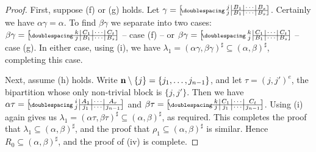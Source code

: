 \begin{lemma}
\begin{proof}
    First, suppose (f) or (g) holds.  Let
    $\gamma = \bipart{c|c|c|c}{2-4}
    {j & B_1 & \cdots & B_s}{j & B_1 & \cdots & B_s}$.  Certainly we have
    $\alpha\gamma = \alpha$.  To find $\beta\gamma$ we separate into two cases:
    $\beta\gamma = \bipart{c|c|c|c}{1-4}
    {k & C_1 & \cdots & C_t}{j & B_1 & \cdots & B_s}$ -- case (f) -- or
    $\beta\gamma = \bipart{c|c|c|c}{2-4}
    {k & C_1 & \cdots & C_t}{j & B_1 & \cdots & B_s}$ -- case (g).
    In either case, using (i), we have
    $\lambda_1 = (\alpha\gamma, \beta\gamma)^\sharp
    \subseteq (\alpha,\beta)^\sharp$, completing this case.

    Next, assume (h) holds.
    Write $\mathbf{n} \setminus \{j\} = \{j_1, \ldots, j_{n-1}\}$, and let
    $\tau = (j,j')^e$, the bipartition whose only non-trivial block is
    $\{j, j'\}$.  Then we have
    $\alpha\tau = \bipart{c|c|c|c}{2-4}
    {i & A_1 & \cdots & A_r}{j & j_1 & \cdots & j_{n-1}}$ and
    $\beta\tau = \bipart{c|c|c|c}{1-4}
    {k & C_1 & \cdots & C_t}{j & j_1 & \cdots & j_{n-1}}$.
    Using (i) again gives us
    $\lambda_1 = (\alpha\tau, \beta\tau)^\sharp
    \subseteq (\alpha,\beta)^\sharp$,
    as required.  This completes the proof that
    $\lambda_1 \subseteq (\alpha,\beta)^\sharp$, and the proof that
    $\rho_1 \subseteq (\alpha,\beta)^\sharp$ is similar.  Hence $R_0 \subseteq
    (\alpha,\beta)^\sharp$, and the proof of (iv) is complete.
  \end{proof}
\end{lemma}


